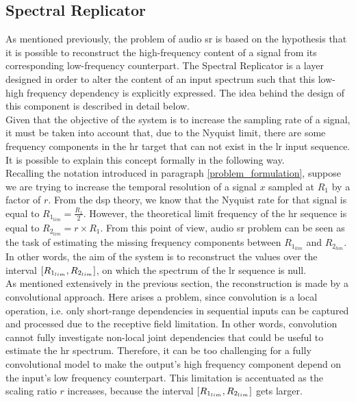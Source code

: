 \subsection{Spectral Replicator} \label{spectral_replicator}
As mentioned previously, the problem of audio \gls{sr} is based on the hypothesis that it is possible to reconstruct the high-frequency content of a signal from its corresponding low-frequency counterpart. The Spectral Replicator is a layer designed in order to alter the content of an input spectrum such that this low-high frequency dependency is explicitly expressed. The idea behind the design of this component is described in detail below. \\
Given that the objective of the system is to increase the sampling rate of a signal, it must be taken into account that, due to the Nyquist limit, there are some frequency components in the \gls{hr} target that can not exist in the \gls{lr} input sequence. It is possible to explain this concept formally in the following way. \\
Recalling the notation introduced in paragraph \ref{problem_formulation}, suppose we are trying to increase the temporal resolution of a signal $x$ sampled at $R_1$ by a factor of $r$. From the \gls{dsp} theory, we know that the Nyquist rate for that signal is equal to $R_{1_{lim}} = \frac{R_1}{2}$. However, the theoretical limit frequency of the \gls{hr} sequence is equal to $R_{2_{lim}} = r \times R_1$. From this point of view, audio \gls{sr} problem can be seen as the task of estimating the missing frequency components between $R_{1_{lim}}$ and $R_{2_{lim}}$. In other words, the aim of the system is to reconstruct the values over the interval $\interval{R_{1_{lim}}}{R_{2_{lim}}}$, on which the spectrum of the \gls{lr} sequence is null. \\
As mentioned extensively in the previous section, the reconstruction is made by a convolutional approach. Here arises a problem, since convolution is a local operation, i.e. only short-range dependencies in sequential inputs can be captured and processed due to the receptive field limitation. In other words, convolution cannot fully investigate non-local joint dependencies that could be useful to estimate the \gls{hr} spectrum. Therefore, it can be too challenging for a fully convolutional model to make the output’s high frequency component depend on the input’s low frequency counterpart. This limitation is accentuated as the scaling ratio $r$ increases, because the interval $\interval{R_{1_{lim}}}{R_{2_{lim}}}$ gets larger. \\
